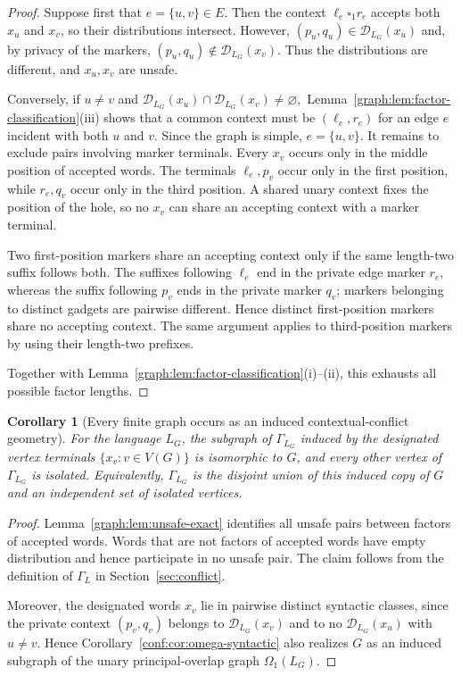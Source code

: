\documentclass[10pt,a4paper]{article}
\newtheorem{corollary}[theorem]{Corollary}
\theoremstyle{definition}
\theoremstyle{remark}
\newcommand{\D}{\mathcal D}
\newcommand{\Om}{\Omega}
\newcommand{\blank}{\square}
\begin{document}
\begin{proof}
Suppose first that \(e=\{u,v\}\in E.\) Then the context \(\ell_e\blank_1r_e\) accepts both \(x_u\) and \(x_v\), so their distributions intersect.
However, \((p_u,q_u)\in\D_{L_G}(x_u)\) and, by privacy of the markers, \((p_u,q_u)\notin\D_{L_G}(x_v).\) Thus the distributions are different, and \(x_u,x_v\) are unsafe.

Conversely, if \(u\neq v\) and
\(\D_{L_G}(x_u)\cap\D_{L_G}(x_v)\neq\varnothing,\)
Lemma~\ref{graph:lem:factor-classification}\textup{(iii)} shows that a common context must be \((\ell_e,r_e)\) for an edge \(e\) incident with both \(u\) and \(v\). Since the graph is
simple, \(e=\{u,v\}.\) It remains to exclude pairs involving marker terminals.
Every \(x_v\) occurs only in the middle position of accepted words.
The terminals \(\ell_e,p_v\) occur only in the first position, while \(r_e,q_v\) occur only in the third position.
A shared unary context fixes the position of the hole, so no \(x_v\) can share
an accepting context with a marker terminal.

Two first-position markers share an accepting context only if the same
length-two suffix follows both. The suffixes following \(\ell_e\) end in the
private edge marker \(r_e\), whereas the suffix following \(p_v\) ends in the
private marker \(q_v\); markers belonging to distinct gadgets are pairwise
different. Hence distinct first-position markers share no accepting context.
The same argument applies to third-position markers by using their length-two
prefixes.

Together with Lemma~\ref{graph:lem:factor-classification}\textup{(i)--(ii)}, this exhausts all possible factor lengths.
\end{proof}

\begin{corollary}[Every finite graph occurs as an induced contextual-conflict geometry]
\label{graph:cor:conflict-realization}
For the language \(L_G\), the subgraph of \(\Gamma_{L_G}\) induced by the
designated vertex terminals \(\{x_v:v\in V(G)\}\) is isomorphic to
\(G\), and every other vertex of \(\Gamma_{L_G}\) is isolated.  Equivalently,
\(\Gamma_{L_G}\) is the disjoint union of this induced copy of \(G\) and an
independent set of isolated vertices.
\end{corollary}

\begin{proof}
Lemma~\ref{graph:lem:unsafe-exact} identifies all unsafe pairs between factors
of accepted words.  Words that are not factors of accepted words have empty
distribution and hence participate in no unsafe pair.  The claim follows from
the definition of \(\Gamma_L\) in Section~\ref{sec:conflict}.

Moreover, the designated words \(x_v\) lie in pairwise distinct syntactic
classes, since the private context \((p_v,q_v)\) belongs to
\(\D_{L_G}(x_v)\) and to no \(\D_{L_G}(x_u)\) with \(u\ne v\).
Hence Corollary~\ref{conf:cor:omega-syntactic} also realizes \(G\) as an
induced subgraph of the unary principal-overlap graph \(\Om_1(L_G)\).
\end{proof}
\end{document}
